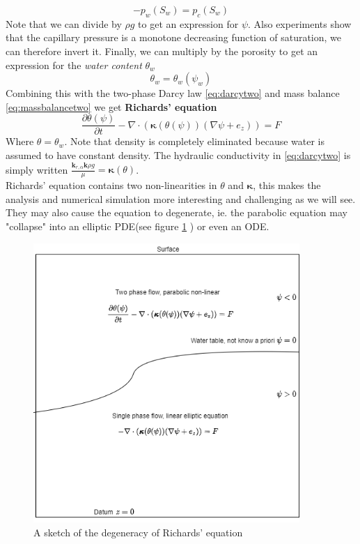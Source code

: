 \documentclass[../Main/main.tex]{subfiles}
\begin{document}
\begin{equation*}
	-p_w(S_w) = p_c(S_w)
\end{equation*}
Note that we can divide by $\rho g$ to get an expression for $\psi$. Also experiments show that the capillary pressure is a monotone decreasing function of saturation, we can therefore invert it. Finally, we can multiply by the porosity to get an expression for the \emph{water content} $\theta_w$
\begin{equation*}
	\theta_w = \theta_w(\psi_w)
\end{equation*}  
Combining this with the two-phase Darcy law \eqref{eq:darcytwo} and mass balance \eqref{eq:massbalancetwo} we get \textbf{Richards' equation}
\begin{equation}\label{eq:richards}
	\frac{\partial \theta(\psi)}{\partial t} - \nabla \cdot (\pmb{\kappa} (\theta (\psi))(\nabla \psi + e_z)) = F
\end{equation}
Where $\theta = \theta_w$. Note that density is completely eliminated because water is assumed to have constant density. The hydraulic conductivity in \eqref{eq:darcytwo} is simply written $\frac{\pmb{k}_{r,\alpha}\pmb{k}\rho g}{\mu} = \pmb{\kappa}(\theta)$. \\
Richards' equation contains two non-linearities in $\theta$ and $\pmb{\kappa}$, this makes the analysis and numerical simulation more interesting and challenging as we will see. They may also cause the equation to degenerate, ie. the parabolic equation may "collapse" into an elliptic PDE(see figure \ref{fig:richards} ) or even an ODE.
\begin{figure}[h]
	\centering
	\includegraphics[width=0.9\textwidth]{Richards.png}
	\caption{A sketch of the degeneracy of Richards' equation}
	\label{fig:richards}
\end{figure}




\listoftodos[Notes]
 
\end{document}

